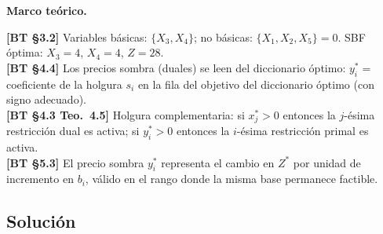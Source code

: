 \documentclass{article}
\newenvironment{marco}{\begin{mdframed}[linecolor=black!40,backgroundcolor=gray!5]\small\textbf{Marco teórico.}\par\smallskip}{\end{mdframed}\medskip}
\begin{document}
\begin{marco}
\textbf{[BT §3.2]} Variables básicas: $\{X_3, X_4\}$; no básicas: $\{X_1, X_2, X_5\} = 0$. SBF óptima: $X_3=4$, $X_4=4$, $Z=28$. \\[2pt]
\textbf{[BT §4.4]} Los precios sombra (duales) se leen del diccionario óptimo: $y_i^* = $ coeficiente de la holgura $s_i$ en la fila del objetivo del diccionario óptimo (con signo adecuado). \\[2pt]
\textbf{[BT §4.3 Teo.\ 4.5]} Holgura complementaria: si $x_j^* > 0$ entonces la $j$-ésima restricción dual es activa; si $y_i^* > 0$ entonces la $i$-ésima restricción primal es activa. \\[2pt]
\textbf{[BT §5.3]} El precio sombra $y_i^*$ representa el cambio en $Z^*$ por unidad de incremento en $b_i$, válido en el rango donde la misma base permanece factible.
\end{marco}

\subsection*{Solución}
\end{document}
